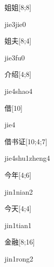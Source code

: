 \begin{verbete}{姐姐}[8;8]
\begin{pronuncia}{jie3jie0}
\end{pronuncia}
\end{verbete}

\begin{verbete}[jie3fu0]{姐夫}[8;4]
\begin{pronuncia}{jie3fu0}
\end{pronuncia}
\end{verbete}

\begin{verbete}{介绍}[4;8]
\begin{pronuncia}{jie4shao4}
\end{pronuncia}
\end{verbete}

\begin{verbete}[jie4]{借}[10]
\begin{pronuncia}{jie4}
\end{pronuncia}
\end{verbete}

\begin{verbete}{借书证}[10;4;7]
\begin{pronuncia}{jie4shu1zheng4}
\end{pronuncia}
\end{verbete}

\begin{verbete}{今年}[4;6]
\begin{pronuncia}{jin1nian2}
\end{pronuncia}
\end{verbete}

\begin{verbete}{今天}[4;4]
\begin{pronuncia}{jin1tian1}
\end{pronuncia}
\end{verbete}

\begin{verbete}{金融}[8;16]
\begin{pronuncia}{jin1rong2}
\end{pronuncia}
\end{verbete}


